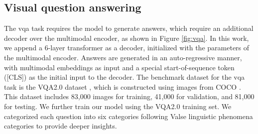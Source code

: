 \subsection{Visual question answering}
The \acrfull{vqa} task requires the model to generate answers, which require an additional decoder over the multimodal encoder, as shown in Figure \ref{fig:vqa}. 
In this work, we append a 6-layer transformer as a decoder, initialized with the parameters of the multimodal encoder. 
Answers are generated in an auto-regressive manner, with multimodal embeddings as input and a special start-of-sequence token ([CLS]) as the initial input to the decoder.
The benchmark dataset for the \acrshort{vqa} task is the VQA2.0 dataset \cite{vqa2}, which is constructed using images from COCO \cite{mscoco}. 
This dataset includes 83,000 images for training, 41,000 for validation, and 81,000 for testing.
We further train our model using the VQA2.0 training set.
We categorized each question into six categories following Valse linguistic phenomena categories to provide deeper insights.
